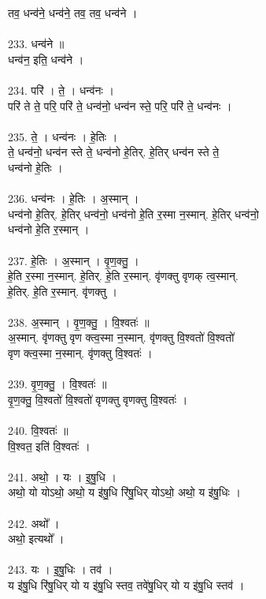 तव॒ धन्व॑ने॒ धन्व॑ने॒ तव॒ तव॒ धन्व॑ने ।\\
\\
233. धन्व॑ने ॥\\
धन्व॑न॒ इति॒ धन्व॑ने ।\\
\\
234. परि॑ । ते॒ । धन्व॑नः ।\\
परि॑ ते ते॒ परि॒ परि॑ ते॒ धन्व॑नो॒ धन्व॑न स्ते॒ परि॒ परि॑ ते॒ धन्व॑नः ।\\
\\
235. ते॒ । धन्व॑नः । हे॒तिः ।\\
ते॒ धन्व॑नो॒ धन्व॑न स्ते ते॒ धन्व॑नो हे॒तिर्. हे॒तिर् धन्व॑न स्ते ते॒\\
धन्व॑नो हे॒तिः ।\\
\\
236. धन्व॑नः । हे॒तिः । अ॒स्मान् ।\\
धन्व॑नो हे॒तिर्. हे॒तिर् धन्व॑नो॒ धन्व॑नो हे॒ति र॒स्मा न॒स्मान्. हे॒तिर् धन्व॑नो॒\\
धन्व॑नो हे॒ति र॒स्मान् ।\\
\\
237. हे॒तिः । अ॒स्मान् । वृ॒ण॒क्तु॒ ।\\
हे॒ति र॒स्मा न॒स्मान्. हे॒तिर्. हे॒ति र॒स्मान्. वृ॑णक्तु वृणक् त्व॒स्मान्.\\
हे॒तिर्. हे॒ति र॒स्मान्. वृ॑णक्तु ।\\
\\
238. अ॒स्मान् । वृ॒ण॒क्तु॒ । वि॒श्वतः॑ ॥\\
अ॒स्मान्. वृ॑णक्तु वृण क्त्व॒स्मा न॒स्मान्. वृ॑णक्तु वि॒श्वतो॑ वि॒श्वतो॑\\
वृण क्त्व॒स्मा न॒स्मान्. वृ॑णक्तु वि॒श्वतः॑ ।\\
\\
239. वृ॒ण॒क्तु॒ । वि॒श्वतः॑ ॥\\
वृ॒ण॒क्तु॒ वि॒श्वतो॑ वि॒श्वतो॑ वृणक्तु वृणक्तु वि॒श्वतः॑ ।\\
\\
240. वि॒श्वतः॑ ॥\\
वि॒श्वत॒ इति॑ वि॒श्वतः॑ ।\\
\\
241. अथो॒ । यः । इ॒षु॒धि ।\\
अथो॒ यो योऽथो॒ अथो॒ य इ॑षु॒धि रि॑षु॒धिर् योऽथो॒ अथो॒ य इ॑षु॒धिः ।\\
\\
242. अथो᳚ ।\\
अथो॒ इत्यथो᳚ ।\\
\\
243. यः । इ॒षु॒धिः । तव॑ ।\\
य इ॑षु॒धि रि॑षु॒धिर् यो य इ॑षु॒धि स्तव॒ तवे॑षु॒धिर् यो य इ॑षु॒धि स्तव॑ ।\\
